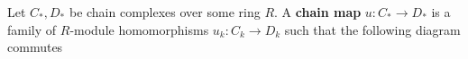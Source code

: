 \begin{definition}
  Let $C_{*},D_{*}$ be chain complexes over some ring $R$. A \textbf{chain map} $u: C_{*} \to D_{*}$ is a family of $R$-module homomorphisms $u_{k}: C_{k} \to D_{k}$ such that the following diagram commutes
  \begin{center}
  \end{center}
\end{definition}

